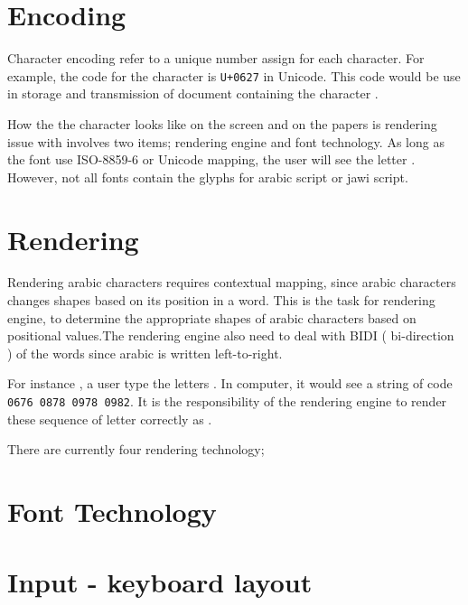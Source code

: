 \documentclass[]{IEEEconf}
\begin{document}
\section{Encoding}

Character encoding refer to a unique number assign for each character.
For example, the code for the character  is \verb|U+0627| in Unicode. This code would be use in storage and transmission of document containing the character .

How the the character looks like on the screen and on the papers is rendering issue with involves two items; rendering engine and font technology. As long as the font use ISO-8859-6 or Unicode mapping, the user will see the letter . However, not all fonts contain the glyphs for arabic script or jawi script.


\section{Rendering}

Rendering arabic characters requires contextual mapping, since arabic characters changes shapes based on its position in a word. This is the task for rendering engine, to determine the appropriate shapes of arabic characters based on positional values.The rendering engine also need to deal with BIDI ( bi-direction ) of the words since arabic is written left-to-right.


For instance , a user type the letters . In computer, it would see a string of code \verb|0676 0878 0978 0982|. It is the responsibility of the rendering engine to render these sequence  of letter correctly as .


There are currently four rendering technology; 

\section{Font Technology}



\section{Input - keyboard layout}
\end{document}
